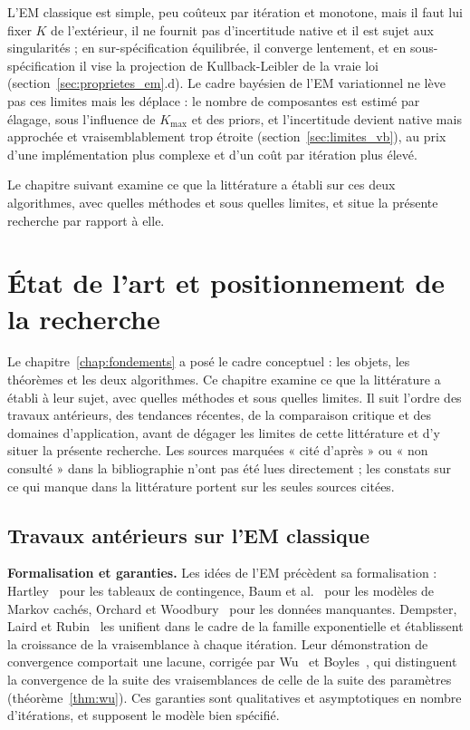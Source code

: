 L'EM classique est simple, peu coûteux par itération et monotone, mais il faut lui fixer $K$ de l'extérieur, il ne fournit pas d'incertitude native et il est sujet aux singularités ; en sur-spécification équilibrée, il converge lentement, et en sous-spécification il vise la projection de Kullback-Leibler de la vraie loi (section~\ref{sec:proprietes_em}.d). Le cadre bayésien de l'EM variationnel ne lève pas ces limites mais les déplace : le nombre de composantes est estimé par élagage, sous l'influence de $K_{\max}$ et des priors, et l'incertitude devient native mais approchée et vraisemblablement trop étroite (section~\ref{sec:limites_vb}), au prix d'une implémentation plus complexe et d'un coût par itération plus élevé.

Le chapitre suivant examine ce que la littérature a établi sur ces deux algorithmes, avec quelles méthodes et sous quelles limites, et situe la présente recherche par rapport à elle.


\chapter{État de l'art et positionnement de la recherche}\label{chap:etat_art}
Le chapitre~\ref{chap:fondements} a posé le cadre conceptuel : les objets, les théorèmes et les deux algorithmes. Ce chapitre examine ce que la littérature a établi à leur sujet, avec quelles méthodes et sous quelles limites. Il suit l'ordre des travaux antérieurs, des tendances récentes, de la comparaison critique et des domaines d'application, avant de dégager les limites de cette littérature et d'y situer la présente recherche. Les sources marquées « cité d'après » ou « non consulté » dans la bibliographie n'ont pas été lues directement ; les constats sur ce qui manque dans la littérature portent sur les seules sources citées.

\section{Travaux antérieurs sur l'EM classique}\label{sec:ea_em}
\textbf{Formalisation et garanties. }Les idées de l'EM précèdent sa formalisation : Hartley~\cite{hartley1958} pour les tableaux de contingence, Baum et al.~\cite{baum1970} pour les modèles de Markov cachés, Orchard et Woodbury~\cite{orchard1972} pour les données manquantes. Dempster, Laird et Rubin~\cite{dempster1977} les unifient dans le cadre de la famille exponentielle et établissent la croissance de la vraisemblance à chaque itération. Leur démonstration de convergence comportait une lacune, corrigée par Wu~\cite{wu1983} et Boyles~\cite{boyles1983}, qui distinguent la convergence de la suite des vraisemblances de celle de la suite des paramètres (théorème~\ref{thm:wu}). Ces garanties sont qualitatives et asymptotiques en nombre d'itérations, et supposent le modèle bien spécifié.


